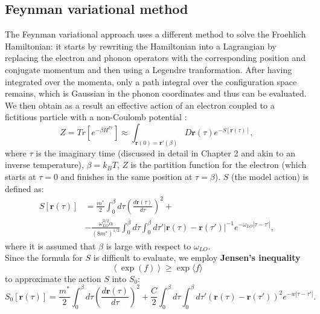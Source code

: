 \subsection{Feynman variational method}
The Feynman variational approach \cite{feynman1955slow} uses a different method to solve the Froehlich Hamiltonian: it starts by rewriting the 
Hamiltonian into a Lagrangian by replacing the electron and phonon operators with the corresponding position and conjugate momentum and then using a Legendre tranformation. 
After having integrated over the momenta, only a path integral over the configuration space remains, which is Gaussian in the phonon coordinates and thus 
can be evaluated.\\
We then obtain as a result an effective action of an electron coupled to a fictitious particle with a non-Coulomb potential \cite{guster2021frohlich}:
\begin{equation}
    Z=Tr[e^{-\beta H^{Fr}}]\approx \int_{\mathbf{r}(0)=\mathbf{r}'(\beta)}D\mathbf{r}(\tau)e^{-S[\mathbf{r}(\tau)]},
\end{equation}
where $\tau$ is the imaginary time (discussed in detail in Chapter 2 and akin to an inverse temperature), $\beta=k_BT$, $Z$ is the partition function for the electron 
(which starts at $\tau=0$ and finishes in the same position at $\tau=\beta$). $S$ (the model action) is defined as:
\begin{equation}
\begin{split}
    S[\mathbf{r}(\tau)]&=\frac{m^*}{2}\int_0^\beta d\tau \left(\frac{d\mathbf{r}(\tau)}{d\tau}\right)^2+\\
    &-\frac{\omega_{LO}^{3/2}\alpha}{(8m^*)^{1/2}}\int_{0}^{\beta}d\tau\int_{0}^{\beta}d\tau' |\mathbf{r}(\tau)-\mathbf{r}(\tau')|^{-1}e^{-\omega_{LO}|\tau-\tau'|},
\end{split}
\end{equation}
where it is assumed that $\beta$ is large with respect to $\omega_{LO}$.\\
Since the formula for $S$ is difficult to evaluate, we employ \textbf{Jensen's inequality}
\begin{equation}
    \left\langle \exp{(f)} \right\rangle\ge \exp{\langle f\rangle}
\end{equation}
to approximate the action $S$ into $S_0$:
\begin{equation}
    S_0[\mathbf{r}(\tau)]=\frac{m^*}{2}\int_0^\beta d\tau\left(\frac{d\mathbf{r}(\tau)}{d\tau}\right)^2+\frac{C}{2}\int_0^\beta d\tau \int_0^\beta d\tau' \left(\mathbf{r}(\tau)-\mathbf{r}(\tau')\right)^2e^{-w|\tau-\tau'|}.
\end{equation}
